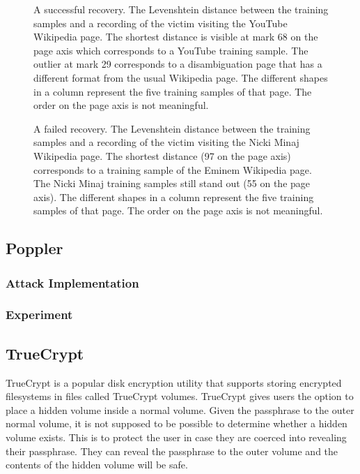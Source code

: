 \documentclass[letterpaper,twocolumn,10pt]{article}
\begin{document}
\begin{figure*}
    \centering
    
    \caption{A successful recovery. The Levenshtein distance between the
    training samples and a recording of the victim visiting the YouTube
    Wikipedia page. The shortest distance is visible at mark 68 on the page axis
    which corresponds to a YouTube training sample. The outlier at mark 29
    corresponds to a disambiguation page that has a different format from the
usual Wikipedia page. The different shapes in a column represent the five
training samples of that page. The order on the page axis is not meaningful.}
    \label{figure:youtube}
\end{figure*}

\begin{figure*}
    \centering
    
    \caption{A failed recovery. The Levenshtein distance between the training samples and
        a recording of the victim visiting the Nicki Minaj Wikipedia page. The
        shortest distance (97 on the page axis) corresponds to a training sample
        of the Eminem Wikipedia page. The Nicki Minaj training samples still
        stand out (55 on the page axis). The different shapes in a column
        represent the five training samples of that page. The order on the page
        axis is not meaningful.}
    \label{figure:minaj}
\end{figure*}

\subsection{Poppler}

\subsubsection{Attack Implementation}

\subsubsection{Experiment}

\subsection{TrueCrypt}

TrueCrypt is a popular disk encryption utility that supports storing encrypted
filesystems in files called TrueCrypt volumes. TrueCrypt gives users the option
to place a hidden volume inside a normal volume. Given the passphrase to the
outer normal volume, it is not supposed to be possible to determine whether
a hidden volume exists. This is to protect the user in case they are coerced
into revealing their passphrase. They can reveal the passphrase to the outer
volume and the contents of the hidden volume will be safe. 
\end{document}
